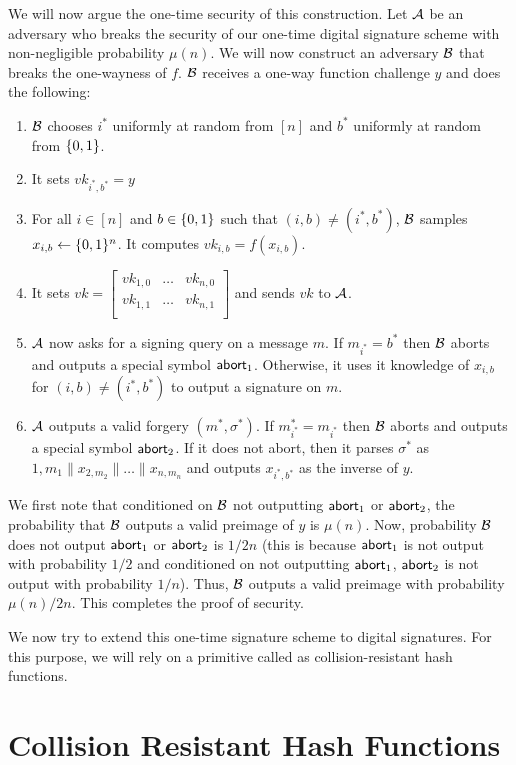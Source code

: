 We will now argue the one-time security of this construction. Let $\mathcal{A}$ be an adversary who breaks the security of our one-time digital signature scheme with non-negligible probability $\mu(n)$. We will now construct an adversary $\mathcal{B}$ that breaks the one-wayness of $f$. $\mathcal{B}$ receives a one-way function challenge $y$ and does the following:
\begin{enumerate}
    \item $\mathcal{B}$ chooses $i^*$ uniformly at random from $[n]$ and $b^*$ uniformly at random from $\{0,1\}$.
    \item It sets $vk_{i^*,b^*} = y$
    \item For all $i \in [n]$ and $b \in \{0,1\}$ such that $(i,b) \neq (i^*,b^*)$, $\mathcal{B}$ samples $x_{i,b} \gets \{0,1\}^n$. It computes $vk_{i,b} = f(x_{i,b})$.
    \item It sets $vk = \left[ \begin{array}{ccc}
vk_{1,0} & \ldots& vk_{n,0} \\
vk_{1,1} & \ldots& vk_{n,1} \\
\end{array} \right]$ and sends $vk$ to $\mathcal{A}$.
\item $\mathcal{A}$ now asks for a signing query on a message $m$. If $m_{i^*} = b^*$ then $\mathcal{B}$ aborts and outputs a special symbol $\mathsf{abort}_1$. Otherwise, it uses it knowledge of $x_{i,b}$ for $(i,b) \neq (i^*,b^*)$ to output a signature on $m$.
\item $\mathcal{A}$ outputs a valid forgery $(m^*,\sigma^*)$. If $m^*_{i^*} = m_{i^*}$ then $\mathcal{B}$ aborts and outputs a special symbol $\mathsf{abort}_2$. If it does not abort, then it parses $\sigma^*$ as ${1,m_1}\|x_{2,m_2}\| \ldots \| x_{n,m_n}$ and outputs $x_{i^*,b^*}$ as the inverse of $y$.
\end{enumerate}
We first note that conditioned on $\mathcal{B}$ not outputting $\mathsf{abort}_1$ or $\mathsf{abort}_2$, the probability that $\mathcal{B}$ outputs a valid preimage of $y$ is $\mu(n)$. Now, probability $\mathcal{B}$ does not output $\mathsf{abort}_1$ or $\mathsf{abort}_2$ is $1/2n$ (this is because $\mathsf{abort}_1$ is not output with probability $1/2$ and conditioned on not outputting $\mathsf{abort}_1$, $\mathsf{abort}_2$ is not output with probability $1/n$). Thus, $\mathcal{B}$ outputs a valid preimage with probability $\mu(n)/2n$. This completes the proof of security.

We now try to extend this one-time signature scheme to digital signatures. For this purpose, we will rely on a primitive called as collision-resistant hash functions.

\section{Collision Resistant Hash Functions}

